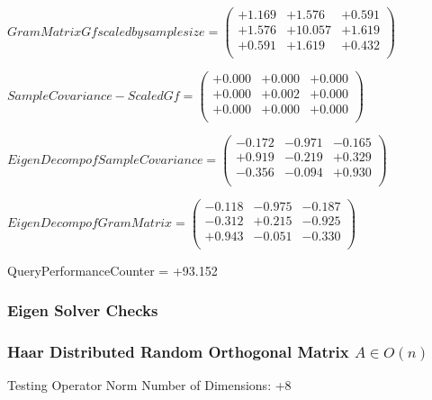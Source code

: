\documentclass[9pt]{article}
\theoremstyle{plain}
\theoremstyle{definition}
\theoremstyle{remark}
\numberwithin{equation}{section}
\begin{document}
$Gram Matrix Gf  scaled by sample size = \left(
\begin{array}{
ccc}
+1.169 & +1.576 & +0.591 \\
+1.576 & +10.057 & +1.619 \\
+0.591 & +1.619 & +0.432 \\
\end{array}
\right)$ \newline 

$SampleCovariance - Scaled Gf = \left(
\begin{array}{
ccc}
+0.000 & +0.000 & +0.000 \\
+0.000 & +0.002 & +0.000 \\
+0.000 & +0.000 & +0.000 \\
\end{array}
\right)$ \newline 

$EigenDecomp of SampleCovariance = \left(
\begin{array}{
ccc}
-0.172 & -0.971 & -0.165 \\
+0.919 & -0.219 & +0.329 \\
-0.356 & -0.094 & +0.930 \\
\end{array}
\right)$ \newline 

$EigenDecomp of Gram Matrix = \left(
\begin{array}{
ccc}
-0.118 & -0.975 & -0.187 \\
-0.312 & +0.215 & -0.925 \\
+0.943 & -0.051 & -0.330 \\
\end{array}
\right)$ \newline 

QueryPerformanceCounter  =  +93.152
\subsubsection{Eigen Solver Checks}
\subsubsection{Haar Distributed Random Orthogonal Matrix $A \in O(n)$}
 Testing Operator Norm
Number of Dimensions: +8
\end{document}
